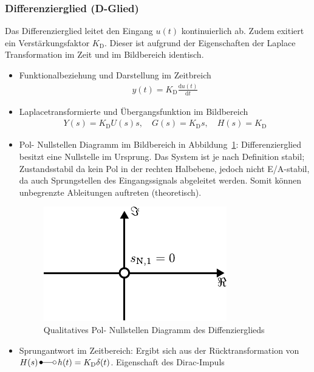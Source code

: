 \subsubsection{Differenzierglied (D-Glied)}
%
Das Differenzierglied leitet den Eingang $u(t)$ kontinuierlich ab. Zudem exitiert ein Verstärkungsfaktor $K_{\text{D}}$. Dieser ist aufgrund der Eigenschaften der Laplace Transformation im Zeit und im Bildbereich identisch.
%
\begin{itemize}
	\item Funktionalbeziehung und Darstellung im Zeitbreich
	\begin{equation*}
	\begin{aligned}
	y(t)=K_{\text{D}}\frac{\text{d}u(t)}{\text{d}t}
	\end{aligned}
	\end{equation*}
	\item Laplacetransformierte und Übergangsfunktion im Bildbereich
	\begin{equation*}
	\begin{aligned}
 	Y(s)=K_{\text{D}}U(s)s,\quad G(s)=K_{\text{D}}s,\quad H(s)=K_{\text{D}}
	\end{aligned}
	\end{equation*}
	\item Pol- Nullstellen Diagramm im Bildbereich in Abbildung~\ref{fig:dgliedpn}: Differenzierglied besitzt eine Nullstelle im Ursprung. Das System ist je nach Definition stabil; Zustandsstabil da kein Pol in der rechten Halbebene, jedoch nicht E/A-stabil, da auch Sprungstellen des Eingangssignals abgeleitet werden. Somit können unbegrenzte Ableitungen auftreten (theoretisch).
	\begin{figure}[h]
		\centering
		\includegraphics[width=0.4\linewidth]{Abbildungen/Modellbildung/PDF/Dgliedpn.pdf}
		\caption{Qualitatives Pol- Nullstellen Diagramm des Diffenzierglieds}
		\label{fig:dgliedpn}
	\end{figure}
	\item Sprungantwort im Zeitbereich: Ergibt sich aus der Rücktransformation von \\$H(s) \,\Laplace\, h(t)=K_{\text{D}}\delta(t)$. Eigenschaft des Dirac-Impuls

\end{itemize}

